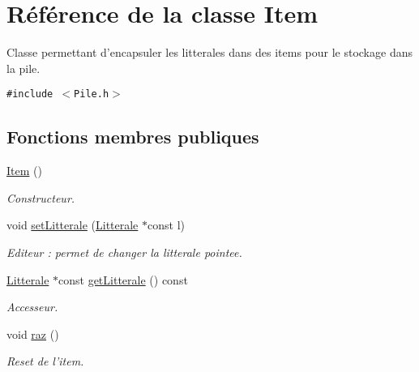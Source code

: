 \hypertarget{class_item}{
\section{Référence de la classe Item}
\label{class_item}
}
Classe permettant d'encapsuler les litterales dans des items pour le stockage dans la pile.  


{\tt \#include $<$Pile.h$>$}

\subsection*{Fonctions membres publiques}
\begin{CompactItemize}
\item 
\hypertarget{class_item_297720c02984eab37332ae795d22189d}{
\hyperlink{class_item_297720c02984eab37332ae795d22189d}{Item} ()}
\label{class_item_297720c02984eab37332ae795d22189d}

\begin{CompactList}\small\item\em Constructeur. \item\end{CompactList}\item 
void \hyperlink{class_item_0c2c0a79074c81befa8d1956636cd67d}{setLitterale} (\hyperlink{class_litterale}{Litterale} $\ast$const l)
\begin{CompactList}\small\item\em Editeur : permet de changer la litterale pointee. \item\end{CompactList}\item 
\hyperlink{class_litterale}{Litterale} $\ast$const \hyperlink{class_item_128005ee69ac247ac82460c21f85ce3f}{getLitterale} () const 
\begin{CompactList}\small\item\em Accesseur. \item\end{CompactList}\item 
\hypertarget{class_item_24858085cb6b69b1776423bc9a6ce4ce}{
void \hyperlink{class_item_24858085cb6b69b1776423bc9a6ce4ce}{raz} ()}
\label{class_item_24858085cb6b69b1776423bc9a6ce4ce}

\begin{CompactList}\small\item\em Reset de l'item. \item\end{CompactList}\end{CompactItemize}


